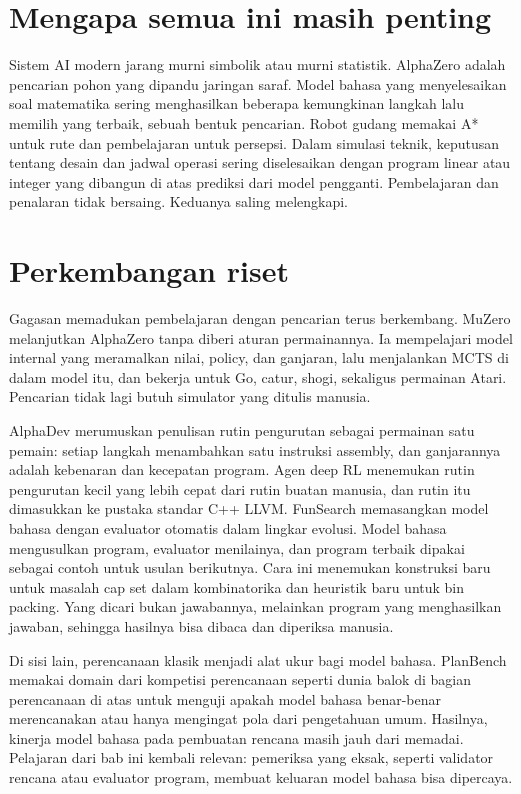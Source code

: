 \section{Mengapa semua ini masih penting}

Sistem AI modern jarang murni simbolik atau murni statistik. AlphaZero adalah pencarian pohon yang
dipandu jaringan saraf. Model bahasa yang menyelesaikan soal matematika sering menghasilkan
beberapa kemungkinan langkah lalu memilih yang terbaik, sebuah bentuk pencarian. Robot gudang
memakai A* untuk rute dan pembelajaran untuk persepsi. Dalam simulasi teknik, keputusan tentang
desain dan jadwal operasi sering diselesaikan dengan program linear atau integer yang dibangun di
atas prediksi dari model pengganti. Pembelajaran dan penalaran tidak bersaing. Keduanya saling
melengkapi.

\section{Perkembangan riset}

Gagasan memadukan pembelajaran dengan pencarian terus berkembang. MuZero \citep{schrittwieser2020} melanjutkan AlphaZero
tanpa diberi aturan permainannya. Ia mempelajari model internal yang meramalkan nilai, policy, dan ganjaran, lalu
menjalankan MCTS di dalam model itu, dan bekerja untuk Go, catur, shogi, sekaligus permainan Atari. Pencarian tidak lagi
butuh simulator yang ditulis manusia.

AlphaDev \citep{mankowitz2023} merumuskan penulisan rutin pengurutan sebagai permainan satu pemain: setiap langkah
menambahkan satu instruksi assembly, dan ganjarannya adalah kebenaran dan kecepatan program. Agen deep RL menemukan rutin
pengurutan kecil yang lebih cepat dari rutin buatan manusia, dan rutin itu dimasukkan ke pustaka standar C++ LLVM.
FunSearch \citep{romeraparedes2024} memasangkan model bahasa dengan evaluator otomatis dalam lingkar evolusi. Model bahasa
mengusulkan program, evaluator menilainya, dan program terbaik dipakai sebagai contoh untuk usulan berikutnya. Cara ini
menemukan konstruksi baru untuk masalah cap set dalam kombinatorika dan heuristik baru untuk bin packing. Yang dicari
bukan jawabannya, melainkan program yang menghasilkan jawaban, sehingga hasilnya bisa dibaca dan diperiksa manusia.

Di sisi lain, perencanaan klasik menjadi alat ukur bagi model bahasa. PlanBench \citep{valmeekam2023} memakai domain dari
kompetisi perencanaan seperti dunia balok di bagian perencanaan di atas untuk menguji apakah model bahasa benar-benar
merencanakan atau hanya mengingat pola dari pengetahuan umum. Hasilnya, kinerja model bahasa pada pembuatan rencana
masih jauh dari memadai. Pelajaran dari bab ini kembali relevan: pemeriksa yang eksak, seperti validator rencana atau
evaluator program, membuat keluaran model bahasa bisa dipercaya.

